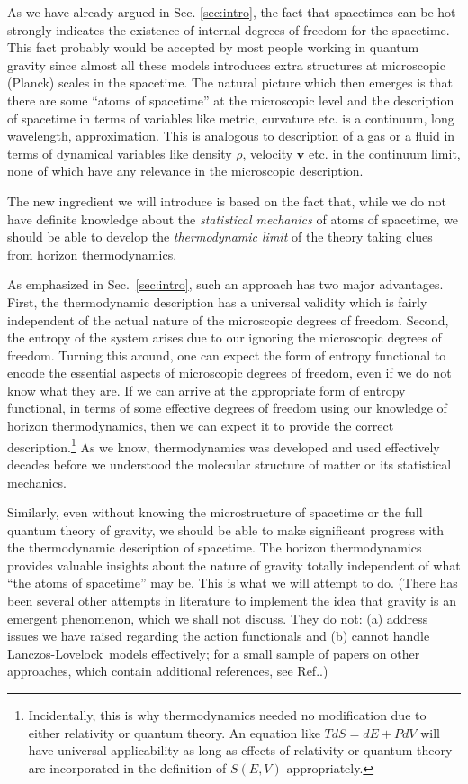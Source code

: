 \documentclass[12pt]{iopart}
\newcommand{\LL}{Lanczos-Lovelock}
\begin{document}
As we have already argued in Sec. \ref{sec:intro}, the fact that spacetimes can be hot strongly indicates the existence of internal degrees of freedom for the spacetime.
This fact probably would be accepted by most people working in quantum gravity since almost all these models introduces extra structures at microscopic (Planck) scales in the spacetime. The natural picture which then emerges is that there are some ``atoms of spacetime'' at the microscopic level and the description of spacetime in terms of variables like metric, curvature etc. is a continuum, long wavelength, approximation. This is analogous to description of a gas or a fluid in terms of dynamical variables like density $\rho$, velocity $\mathbf{v}$ etc. in the continuum limit, none of which have any relevance in the microscopic description. 

The new ingredient we will introduce is based on the fact that, while we do not have definite knowledge about the \textit{statistical mechanics} of atoms of spacetime, we should be able to develop the \textit{thermodynamic limit} of the theory taking clues from horizon thermodynamics.


As emphasized in Sec.~\ref{sec:intro}, such an approach has two major advantages.
First, the thermodynamic description has a universal validity which is fairly independent of the actual nature of the microscopic degrees of freedom. 
Second, the entropy of the system arises due to our ignoring the microscopic degrees of freedom. Turning this around, one can expect the form of entropy functional to encode the essential aspects of microscopic degrees of freedom, even if we do not know what they are. If we can arrive at the appropriate form of entropy functional, in terms of some effective degrees of freedom using our knowledge of horizon thermodynamics, then we can expect it to provide the correct description.\footnote{Incidentally, this is why thermodynamics needed no modification due to either relativity or quantum theory. An equation like $TdS=dE+PdV$ will have universal applicability as long as effects of relativity or quantum theory are incorporated in the definition of $S(E,V)$ appropriately.}
As we know, thermodynamics was developed
and used effectively decades before we  understood  the molecular structure of matter or its statistical mechanics. 

Similarly, even without knowing the microstructure of spacetime or the full quantum theory of gravity, we should be able to make significant progress with the thermodynamic description of spacetime. 
The horizon thermodynamics
provides \cite{tworeviews} valuable insights about the nature of gravity totally independent of what ``the atoms of spacetime'' may be. 
This is what we will attempt to do. (There has been several other attempts in literature to implement the idea that gravity is an emergent phenomenon, which we shall not discuss. They do not: (a) address issues we have raised regarding  the action functionals and (b) cannot handle \LL\ models effectively; for a small sample of papers on other approaches, which contain additional references, see Ref.\cite{others}.)
\end{document}
